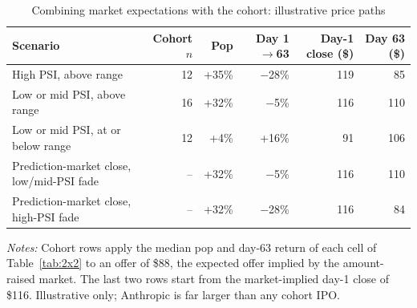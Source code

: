 \begin{table}[!htbp]\centering\footnotesize
\caption{Combining market expectations with the cohort: illustrative price paths}\label{tab:pm5}

\begin{threeparttable}
\begin{tabular}{lrrrrr}
\toprule
Scenario & Cohort $n$ & Pop & Day 1$\to$63 & Day-1 close (\$) & Day 63 (\$) \\
\midrule
High PSI, above range & 12 & +35\% & $-$28\% & 119 & 85 \\
Low or mid PSI, above range & 16 & +32\% & $-$5\% & 116 & 110 \\
Low or mid PSI, at or below range & 12 & +4\% & +16\% & 91 & 106 \\
\midrule
Prediction-market close, low/mid-PSI fade & -- & +32\% & $-$5\% & 116 & 110 \\
Prediction-market close, high-PSI fade & -- & +32\% & $-$28\% & 116 & 84 \\
\bottomrule
\end{tabular}
\begin{tablenotes}[flushleft]\footnotesize
\item \textit{Notes:} Cohort rows apply the median pop and day-63 return of each cell of Table~\ref{tab:2x2} to an offer of \$88, the expected offer implied by the amount-raised market. The last two rows start from the market-implied day-1 close of \$116. Illustrative only; Anthropic is far larger than any cohort IPO.
\end{tablenotes}
\end{threeparttable}

\end{table}
